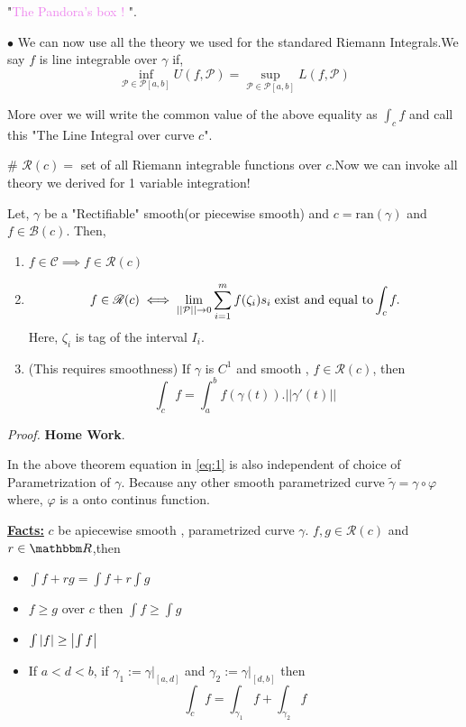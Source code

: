 \documentclass[Analysis-3]{subfiles}
\begin{document}
"\textcolor{violet}{The Pandora's box !} ".
\vspace{0.3cm}

$\bullet$ We can now use all the theory we used for the standared Riemann Integrals.We say $f$ is line integrable over $\gamma$ if, 
\[\inf_{\mathcal{P} \in \mathscr{P}[a,b]} U(f,\mathcal{P}) = \sup_{\mathcal{P} \in \mathscr{P}[a,b]} L(f,\mathcal{P})\]

More over we will write the common value of the above equality as $\int_c f$ and call this "The Line Integral over curve $c$".

\# \textbf{$\mathscr{R}(c)=$} set of all Riemann integrable functions over $c$.Now we can invoke all theory we derived for 1 variable integration! 

\begin{Thm}{}{}\label{thm1:23}
Let, $\gamma$ be a "Rectifiable" smooth(or piecewise smooth) and $c = \text{ran}(\gamma)$ and $f \in \mathscr{B}(c)$. Then,
\begin{enumerate}
    \item $f \in \mathscr{C} \implies f \in \mathscr{R}(c)$
    \item \[ f \in \mathscr{R}(c) \iff \lim_{||\mathcal{P}||\to 0} \sum_{i=1}^{m} f(\zeta_i)s_i \hspace{0.1cm} \text{exist and equal to}\int_c f.\] Here, $\zeta_i$ is tag of the interval $I_i$.
    
    \item (This requires smoothness) If $\gamma$ is $C^1$ and smooth , $f \in \mathscr{R}(c)$, then 
    \[\int_c f = \int_a^b f(\gamma(t)).||\gamma'(t)|| \label{eq:1}\]
   
\end{enumerate}
\end{Thm}

\textit{Proof.} \textbf{Home Work}.

\vspace{0.2cm}

In the above theorem equation in \ref{eq:1} is also independent of choice of Parametrization of $\gamma$. Because any other smooth parametrized curve $\tilde{\gamma} = \gamma \circ \varphi$ where, $\varphi$ is a onto continus function.

\vspace{1cm} 

\textbf{\underline{Facts:}} $c$ be apiecewise smooth , parametrized curve $\gamma$. $f,g \in \mathscr{R}(c)$ and $r \in \R$,then
\begin{itemize}
    \item $\int f+rg = \int f + r\int g $
    \item $f \ge g$ over $c$ then $\int f \ge \int g$
    \item $\int \abs{f} \ge \abs{\int f}$
    \item If $a<d<b$, if $\gamma_1 := \gamma |_{[a,d]}$ and $\gamma_2 := \gamma |_{[d,b]}$ then 
     \[\int_c f = \int_{\gamma_1}f + \int_{\gamma_2} f \]
\end{itemize}
\end{document}
